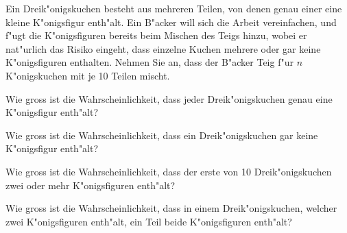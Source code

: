 Ein Dreik"onigskuchen besteht aus mehreren Teilen, von denen genau einer 
eine kleine
K"onigsfigur enth"alt. Ein B"acker will sich die Arbeit vereinfachen, und
f"ugt die K"onigsfiguren bereits beim Mischen des Teigs hinzu,
wobei er nat"urlich das Risiko eingeht, dass einzelne Kuchen mehrere oder
gar keine K"onigsfiguren enthalten. Nehmen Sie an, dass der B"acker Teig
f"ur $n$ K"onigskuchen mit je 10 Teilen mischt.
\begin{teilaufgaben}
\item Wie gross ist die Wahrscheinlichkeit, dass jeder Dreik"onigskuchen genau
eine K"onigsfigur enth"alt?
\item Wie gross ist die Wahrscheinlichkeit, dass ein Dreik"onigskuchen gar
keine K"onigsfigur enth"alt?
\item Wie gross ist die Wahrscheinlichkeit, dass der erste von
10 Dreik"onigskuchen zwei oder mehr K"onigsfiguren enth"alt?
\item Wie gross ist die Wahrscheinlichkeit, dass in einem Dreik"onigskuchen,
welcher zwei K"onigsfiguren enth"alt, ein Teil
beide K"onigsfiguren enth"alt?
\end{teilaufgaben}


